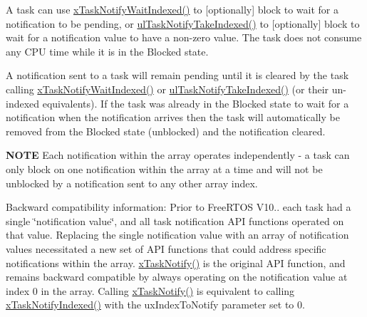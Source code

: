 A task can use \hyperlink{externals_2freertos_2include_2task_8h_a5bcd5a5b7d7c41dd782a38093be1b7c9}{x\+Task\+Notify\+Wait\+Indexed()} to \mbox{[}optionally\mbox{]} block to wait for a notification to be pending, or \hyperlink{externals_2freertos_2include_2task_8h_a4f42982425f3b106e1a9f19b41ba4124}{ul\+Task\+Notify\+Take\+Indexed()} to \mbox{[}optionally\mbox{]} block to wait for a notification value to have a non-\/zero value. The task does not consume any C\+PU time while it is in the Blocked state.

A notification sent to a task will remain pending until it is cleared by the task calling \hyperlink{externals_2freertos_2include_2task_8h_a5bcd5a5b7d7c41dd782a38093be1b7c9}{x\+Task\+Notify\+Wait\+Indexed()} or \hyperlink{externals_2freertos_2include_2task_8h_a4f42982425f3b106e1a9f19b41ba4124}{ul\+Task\+Notify\+Take\+Indexed()} (or their un-\/indexed equivalents). If the task was already in the Blocked state to wait for a notification when the notification arrives then the task will automatically be removed from the Blocked state (unblocked) and the notification cleared.

{\bfseries N\+O\+TE} Each notification within the array operates independently -\/ a task can only block on one notification within the array at a time and will not be unblocked by a notification sent to any other array index.

Backward compatibility information\+: Prior to Free\+R\+T\+OS V10.. each task had a single \char`\"{}notification value\char`\"{}, and all task notification A\+PI functions operated on that value. Replacing the single notification value with an array of notification values necessitated a new set of A\+PI functions that could address specific notifications within the array. \hyperlink{externals_2freertos_2include_2task_8h_a0d2d54fb8a64011dfbb54983e4ed06bd}{x\+Task\+Notify()} is the original A\+PI function, and remains backward compatible by always operating on the notification value at index 0 in the array. Calling \hyperlink{externals_2freertos_2include_2task_8h_a0d2d54fb8a64011dfbb54983e4ed06bd}{x\+Task\+Notify()} is equivalent to calling \hyperlink{externals_2freertos_2include_2task_8h_a0261e3cca34893bdfccbca1be2de93d5}{x\+Task\+Notify\+Indexed()} with the ux\+Index\+To\+Notify parameter set to 0.


